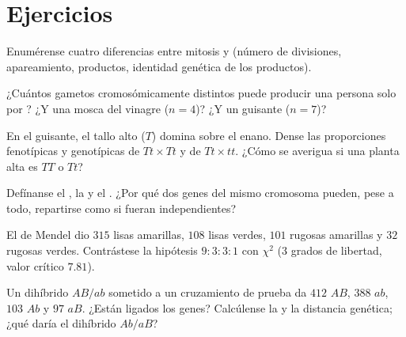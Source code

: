 \section{Ejercicios}

\begin{exercise}[$\star$]\label{exo:b2:meiosis-heredity:1}
Enumérense cuatro diferencias entre mitosis y  (número de
divisiones, apareamiento, productos, identidad genética de los
productos).
\end{exercise}

\begin{exercise}[$\star$]\label{exo:b2:meiosis-heredity:2}
¿Cuántos gametos cromosómicamente distintos puede producir una persona
solo por ? ¿Y una mosca del vinagre ($n = 4$)?
¿Y un guisante ($n =
7$)?
\end{exercise}

\begin{exercise}[$\star$]\label{exo:b2:meiosis-heredity:3}
En el guisante, el tallo alto ($T$) domina sobre el enano. Dense las
proporciones fenotípicas y genotípicas de $Tt \times Tt$ y de
$Tt \times tt$. ¿Cómo se averigua si una planta alta es $TT$ o $Tt$?
\end{exercise}

\begin{exercise}[$\star$]\label{exo:b2:meiosis-heredity:4}
Defínanse el , la  y el .
¿Por qué dos genes del mismo cromosoma pueden, pese a todo, repartirse
como si fueran independientes?
\end{exercise}

\begin{exercise}[$\star\star$]\label{exo:b2:meiosis-heredity:5}
El  de Mendel dio $315$ lisas amarillas, $108$
lisas verdes, $101$ rugosas amarillas y $32$ rugosas verdes. Contrástese
la hipótesis $9 : 3 : 3 :
1$ con $\chi^2$ (3 grados de libertad, valor crítico
$7.81$).
\end{exercise}

\begin{exercise}[$\star\star$]\label{exo:b2:meiosis-heredity:6}
Un dihíbrido $AB/ab$ sometido a un cruzamiento de prueba da $412$ $AB$,
$388$ $ab$, $103$
$Ab$ y $97$ $aB$. ¿Están ligados los genes? Calcúlense la  y la distancia genética; ¿qué daría el dihíbrido $Ab/aB$?
\end{exercise}

